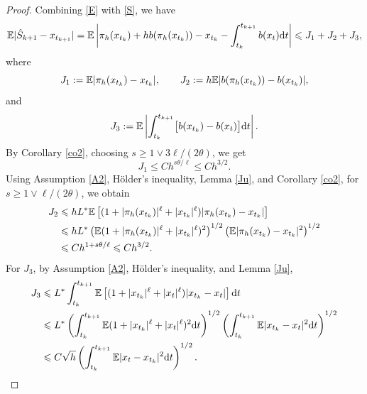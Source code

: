 \documentclass[aap]{imsart}
\theoremstyle{plain}
\theoremstyle{definition}
\begin{document}
 \begin{proof}
 	Combining \eqref{E} with \eqref{S}, we have
 	\begin{equation}\label{LEeq}
 			\mathbb{E} |\hat S_{k+1}-x_{t_{k+1}}|
 			=
 			\mathbb{E}\left|
 			\pi_h(x_{t_k})
 			+h b(\pi_h(x_{t_k}))
 			-x_{t_k}
 			-\int_{t_k}^{t_{k+1}} b(x_t)\mathrm{d} t
 			\right|  \leqslant
 			J_1+J_2+J_3,
 	\end{equation}
 	where
 	\[
 	J_1:=\mathbb{E}|\pi_h(x_{t_k})-x_{t_k}|,
 	\qquad
 	J_2:=h\mathbb{E}|b(\pi_h(x_{t_k}))-b(x_{t_k})|,
 	\]
 	and
 	\[
 	J_3:=
 	\mathbb{E}\left|
 	\int_{t_k}^{t_{k+1}}
 	\bigl[b(x_{t_k})-b(x_t)\bigr]\mathrm{d} t
 	\right|.
 	\]	
 	By Corollary \ref{co2}, choosing
 	\(s\geqslant 1\vee 3\ell/(2\theta)\), we get
 	\begin{equation}\label{LEeq1}
 		J_1
 		\leqslant
 		Ch^{s\theta/\ell}
 		\leqslant
 		Ch^{3/2}.
 	\end{equation}	
 	Using Assumption \ref{A2}, Hölder's inequality, Lemma \ref{Ju}, and
 	Corollary \ref{co2}, for
 	\(s\geqslant 1\vee \ell/(2\theta)\), we obtain
 	\begin{equation}\label{LEeq2}
 		\begin{aligned}
 			J_2
 			&\leqslant
 			hL^*
 			\mathbb{E}\left[
 			(1+|\pi_h(x_{t_k})|^\ell+|x_{t_k}|^\ell)
 			|\pi_h(x_{t_k})-x_{t_k}|
 			\right]  \\
 			&\leqslant
 			hL^*
 			\left(
 			\mathbb{E}(1+|\pi_h(x_{t_k})|^\ell+|x_{t_k}|^\ell)^2
 			\right)^{1/2}
 			\left(
 			\mathbb{E}|\pi_h(x_{t_k})-x_{t_k}|^2
 			\right)^{1/2}  \\
 			&\leqslant
 			Ch^{1+s\theta/\ell}
 			\leqslant
 			Ch^{3/2}.
 		\end{aligned}
 	\end{equation} 	
 	For \(J_3\), by Assumption \ref{A2}, Hölder's inequality, and Lemma \ref{Ju},
 	\begin{equation}\label{LEeq3}
 		\begin{aligned}
 			J_3
 			&\leqslant
 			L^*
 			\int_{t_k}^{t_{k+1}}
 			\mathbb{E}\left[
 			(1+|x_{t_k}|^\ell+|x_t|^\ell)
 			|x_{t_k}-x_t|
 			\right]\mathrm{d} t  \\
 			&\leqslant
 			L^*
 			\left(
 			\int_{t_k}^{t_{k+1}}
 			\mathbb{E}(1+|x_{t_k}|^\ell+|x_t|^\ell)^2\mathrm{d} t
 			\right)^{1/2}
 			\left(
 			\int_{t_k}^{t_{k+1}}
 			\mathbb{E}|x_{t_k}-x_t|^2\mathrm{d} t
 			\right)^{1/2}  \\
 			&\leqslant
 			C\sqrt h
 			\left(
 			\int_{t_k}^{t_{k+1}}
 			\mathbb{E}|x_t-x_{t_k}|^2\mathrm{d} t
 			\right)^{1/2}.
 		\end{aligned}
 	\end{equation}

\end{proof}
\end{document}
